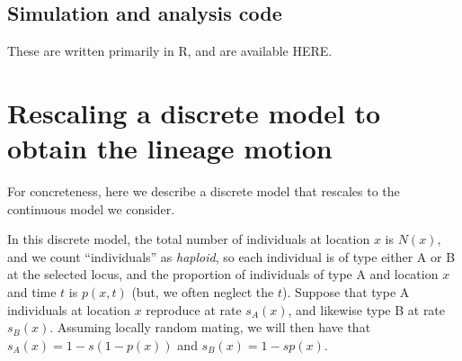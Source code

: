 \documentclass[11pt,letterpaper]{article}
\begin{document}
\subsection*{Simulation and analysis code}

These are written primarily in R, and are available HERE.




\appendix
\setcounter{table}{0}
\renewcommand{\thetable}{S\arabic{table}}
\setcounter{figure}{0}
\renewcommand{\thefigure}{S\arabic{figure}}


\section{Rescaling a discrete model to obtain the lineage motion}
\label{apx:lineage_derivation}

For concreteness, here we describe a discrete model that rescales to the continuous model we consider.

In this discrete model, the total number of individuals at location $x$ is $N(x)$,
and we count ``individuals'' as \emph{haploid},
so each individual is of type either A or B at the selected locus,
and the proportion of individuals of type A and location $x$ and time $t$ is $p(x,t)$
(but, we often neglect the $t$).
Suppose that type A individuals at location $x$ reproduce at rate $s_A(x)$, 
and likewise type B at rate $s_B(x)$.
Assuming locally random mating, we will then have that
$s_A(x) = 1 - s (1-p(x))$ and $s_B(x) = 1 - s p(x)$.
\end{document}
